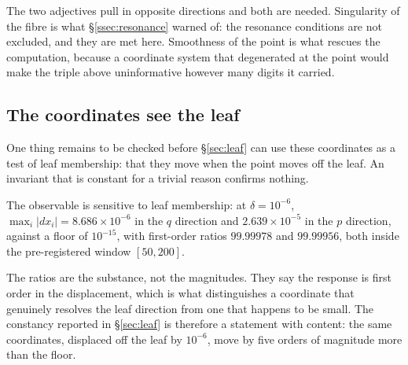 The two adjectives pull in opposite directions and both are needed. Singularity
of the fibre is what \S\ref{ssec:resonance} warned of: the resonance conditions
are not excluded, and they are met here. Smoothness of the point is what
rescues the computation, because a coordinate system that degenerated at the
point would make the triple above uninformative however many digits it carried.

\subsection{The coordinates see the leaf}\label{ssec:sensitivity}

One thing remains to be checked before \S\ref{sec:leaf} can use these
coordinates as a test of leaf membership: that they move when the point moves
off the leaf. An invariant that is constant for a trivial reason confirms
nothing.

\begin{remark}
The observable is sensitive to leaf membership: at $\delta=10^{-6}$,
$\max_i|dx_i|=8.686\times10^{-6}$ in the $q$ direction and
$2.639\times10^{-5}$ in the $p$ direction, against a floor of $10^{-15}$, with
first-order ratios $99.99978$ and $99.99956$, both inside the pre-registered
window $[50,200]$.
\end{remark}

The ratios are the substance, not the magnitudes. They say the response is
first order in the displacement, which is what distinguishes a coordinate that
genuinely resolves the leaf direction from one that happens to be small. The
constancy reported in \S\ref{sec:leaf} is therefore a statement with content:
the same coordinates, displaced off the leaf by $10^{-6}$, move by five orders
of magnitude more than the floor.
